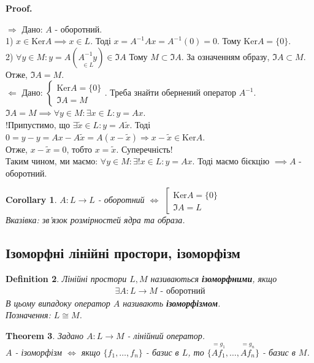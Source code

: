 \documentclass[a4paper, 10pt]{article}
\makeatletter
\def\qed{$\blacksquare$}
\def\ker#1{\textrm{Ker} {#1}}
\def\rightproof{$\boxed{\Rightarrow}$ }
\def\leftproof{$\boxed{\Leftarrow}$ }
\theoremstyle{theoremdd}
\newtheorem{theorem}{Theorem}[subsection]
\theoremstyle{theoremdd}
\newtheorem{definition}[theorem]{Definition}
\theoremstyle{theoremdd}
\theoremstyle{theoremdd}
\theoremstyle{theoremdd}
\theoremstyle{theoremdd}
\theoremstyle{theoremdd}
\theoremstyle{theoremdd}
\newtheorem{corollary}[theorem]{Corollary}
\renewenvironment{proof}[1][Proof.\\]{\par
\pushQED{\hfill \qed}%
\normalfont \topsep6\p@\@plus6\p@\relax
\trivlist
\item\relax
{\bfseries
#1\@addpunct{.}}\hspace\labelsep\ignorespaces
}{%
\popQED\endtrivlist\@endpefalse
}
\makeatother
\begin{document}
	\begin{proof}
	\rightproof Дано: $A$ - оборотний.\\
	1) $x \in \ker A \implies x \in L$. Тоді $x = A^{-1}Ax = A^{-1}(0) = 0$. Тому $\ker A = \{0\}$.\\
	2) $\forall y \in M: y = A(\underset{\in L}{A^{-1}y}) \in \Im A$ Тому $M \subset \Im A$. За означенням образу, $\Im A \subset M$. Отже, $\Im A = M$.
	\bigskip \\
	\leftproof Дано: $\begin{cases} \ker A = \{0\} \\ \Im A = M \end{cases}$. Треба знайти обернений оператор $A^{-1}$.\\
	$\Im A = M \implies \forall y \in M: \exists x \in L: y = Ax$.\\
	!Припустимо, що $\exists \tilde{x} \in L: y = A\tilde{x}$. Тоді $0 = y - y = Ax - A\tilde{x} = A(x-\tilde{x}) \Rightarrow x-\tilde{x} \in \ker A$.\\
	Отже, $x-\tilde{x}=0$, тобто $x = \tilde{x}$. Суперечність!\\
	Таким чином, ми маємо: $\forall y \in M: \exists! x \in L: y = Ax$. Тоді маємо бієкцію $\implies A$ - оборотний.
	\end{proof}
	
	\begin{corollary}
	$A:L \to L$ - оборотний $\iff$ $\left[ \begin{gathered} \ker A = \{0\} \\ \Im A = L \end{gathered} \right.$\\
	\textit{Вказівка: зв'язок розмірностей ядра та образа}.
	\end{corollary}
	
	\subsection{Ізоморфні лінійні простори, ізоморфізм}
	\begin{definition}
	Лінійні простори $L,M$ називаються \textbf{ізоморфними}, якщо
	\begin{align*}
	\exists A: L \to M \text{ - оборотний}
	\end{align*}
	В цьому випадоку оператор $A$ називають \textbf{ізоморфізмом}.\\
	Позначення: $L \cong M$.
	\end{definition}
	
	\begin{theorem}
	Задано $A: L \to M$ - лінійний оператор.\\
	$A$ - ізоморфізм $\iff$ якщо $\{f_1,\dots,f_n\}$ - базис в $L$, то $\{\overset{=g_1}{Af_1},\dots, \overset{=g_n}{Af_n}\}$ - базис в $M$.
	\end{theorem}
	
\end{document}
